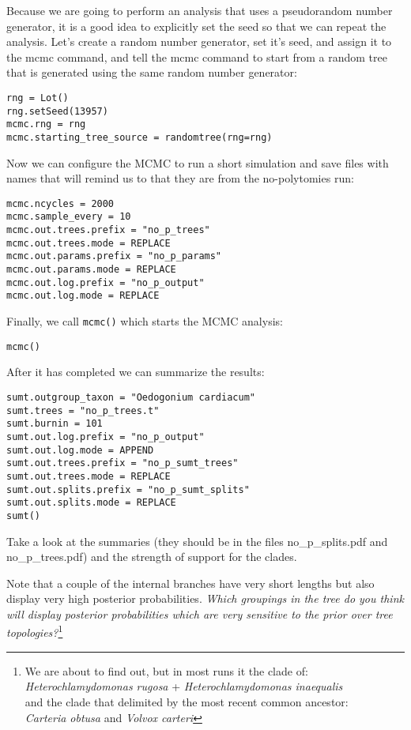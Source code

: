 \documentclass{article}
\newcommand{\cmd}[1]{\texttt{#1}\xspace}
\newcommand{\localfile}[1]{\textsf{#1}\xspace}
\newcommand{\QandA}[2]{\textit{#1}\footnote{#2}\xspace}
\begin{document}
Because we are going to perform an analysis that uses a pseudorandom number generator, it is a 
good idea to explicitly set the seed so that we can repeat the analysis.
Let's create a random number generator, set it's seed, and assign it to the mcmc command, and 
tell the mcmc command to start from a random tree that is generated using the same random
number generator:

\begin{verbatim}
rng = Lot()
rng.setSeed(13957)
mcmc.rng = rng
mcmc.starting_tree_source = randomtree(rng=rng)
\end{verbatim}

Now we can configure the MCMC to run a short simulation and save files with names that
will remind us to that they are from the no-polytomies run:
\begin{verbatim}
mcmc.ncycles = 2000
mcmc.sample_every = 10
mcmc.out.trees.prefix = "no_p_trees"
mcmc.out.trees.mode = REPLACE
mcmc.out.params.prefix = "no_p_params"
mcmc.out.params.mode = REPLACE
mcmc.out.log.prefix = "no_p_output"
mcmc.out.log.mode = REPLACE
\end{verbatim}

Finally, we call \cmd{mcmc()} which starts the MCMC analysis:
\begin{verbatim}
mcmc()
\end{verbatim}

After it has completed we can summarize the results:

\begin{verbatim}
sumt.outgroup_taxon = "Oedogonium cardiacum"
sumt.trees = "no_p_trees.t"
sumt.burnin = 101
sumt.out.log.prefix = "no_p_output"
sumt.out.log.mode = APPEND
sumt.out.trees.prefix = "no_p_sumt_trees"
sumt.out.trees.mode = REPLACE
sumt.out.splits.prefix = "no_p_sumt_splits"
sumt.out.splits.mode = REPLACE
sumt()
\end{verbatim}
Take a look at the summaries (they should be in the files \localfile{no\_p\_splits.pdf} and \localfile{no\_p\_trees.pdf}) and  the strength of support for the clades.

Note that a couple of the internal branches have very short lengths but 
also display very high posterior probabilities.  
\QandA{Which groupings in the tree do you think will display posterior probabilities
which are very sensitive to the prior over tree topologies?}{We are about to find out, but in most runs it the clade of:\\ {\em Heterochlamydomonas rugosa} + {\em Heterochlamydomonas inaequalis}\\ and the clade that delimited by the most recent common ancestor:\\ {\em Carteria obtusa} and {\em Volvox carteri}}
\end{document}

